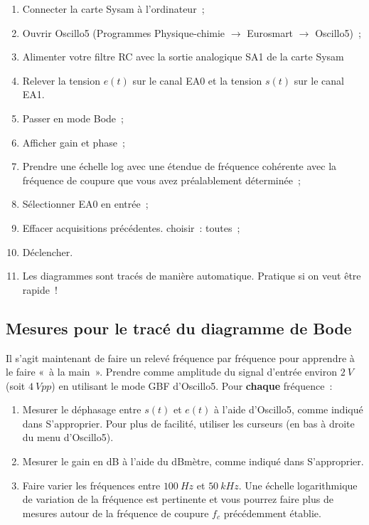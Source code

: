 \documentclass[a4paper, 11pt, final, garamond]{book}
\begin{document}
\begin{enumerate}
    \item Connecter la carte Sysam à l'ordinateur~;
    \item Ouvrir Oscillo5 (Programmes Physique-chimie $\rightarrow$ Eurosmart
        $\rightarrow$ Oscillo5)~;
    \item Alimenter votre filtre RC avec la sortie analogique SA1 de la carte
        Sysam
    \item Relever la tension $e(t)$ sur le canal EA0 et la tension $s(t)$ sur le
        canal EA1.
    \item Passer en mode Bode~;
    \item Afficher gain et phase~;
    \item Prendre une échelle log avec une étendue de fréquence cohérente avec
        la fréquence de coupure que vous avez préalablement déterminée~;
    \item Sélectionner EA0 en entrée~;
    \item Effacer acquisitions précédentes. choisir~: toutes~;
    \item Déclencher.
    \item Les diagrammes sont tracés de manière automatique. Pratique si on veut
        être rapide~!
\end{enumerate}

\subsection{Mesures pour le tracé du diagramme de Bode}

Il s'agit maintenant de faire un relevé fréquence par fréquence pour apprendre à
le faire «~à la main~». Prendre comme amplitude du signal d'entrée environ
$\SI{2}{V}$ (soit $\SI{4}{Vpp}$) en utilisant le mode GBF d'Oscillo5. Pour
\textbf{chaque} fréquence~:

\begin{enumerate}[resume]
    \item Mesurer le déphasage entre $s(t)$ et $e(t)$ à l'aide d'Oscillo5, comme
        indiqué dans S'approprier. Pour plus de facilité, utiliser les curseurs
        (en bas à droite du menu d'Oscillo5).
    \item Mesurer le gain en dB à l'aide du dBmètre, comme indiqué dans
        S'approprier.
    \item Faire varier les fréquences entre $\SI{100}{Hz}$ et $\SI{50}{kHz}$.
        Une échelle logarithmique de variation de la fréquence est pertinente et
        vous pourrez faire plus de mesures autour de la fréquence de coupure
        $f_{c}$ précédemment établie.
\end{enumerate}
\end{document}
